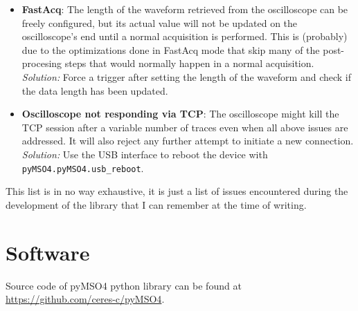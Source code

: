 \documentclass[a4paper,english,twoside,10pt]{article}
\begin{document}
\begin{itemize}
	\item \textbf{FastAcq}: The length of the waveform retrieved from the oscilloscope can be freely configured, but its actual value will not be updated on the oscilloscope's end until a normal acquisition is performed. This is (probably) due to the optimizations done in FastAcq mode that skip many of the post-procesing steps that would normally happen in a normal acquisition.\\
	\textit{Solution:} Force a trigger after setting the length of the waveform and check if the data length has been updated.
	\item \textbf{Oscilloscope not responding via TCP}: The oscilloscope might kill the TCP session after a variable number of traces even when all above issues are addressed. It will also reject any further attempt to initiate a new connection.\\
	\textit{Solution:} Use the USB interface to reboot the device with \texttt{pyMSO4.pyMSO4.usb\_reboot}.
\end{itemize}

This list is in no way exhaustive, it is just a list of issues encountered during the development of the library that I can remember at the time of writing.






\clearpage%
\printglossary[type=\acronymtype]%
\printglossary%
{
\raggedright%
\nocite{ico:oscilloscope}
\nocite{ico:laptop}


}

\clearpage%
\appendix%
\section{Software}\label{app:software}
Source code of pyMSO4 python library can be found at \url{https://github.com/ceres-c/pyMSO4}.
\end{document}
